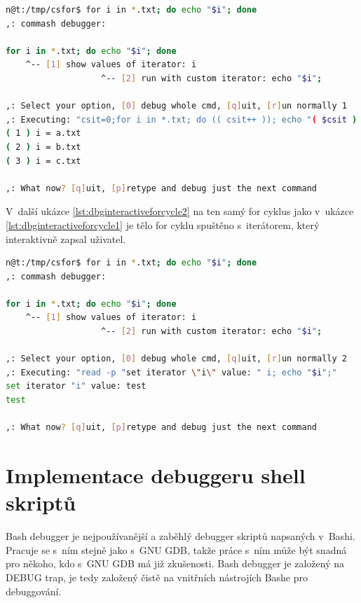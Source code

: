 \documentclass[thesis=M,czech]{FITthesis}[2012/06/26]
\begin{document}
\noindent
\begin{minipage}{\linewidth}
\begin{lstlisting}[language=bash, caption={Debugger interaktivního shellu -- výpis hodnot iterátoru for cyklu }, label={lst:dbginteractiveforcycle1}]
n@t:/tmp/csfor$ for i in *.txt; do echo "$i"; done
,: commash debugger:

for i in *.txt; do echo "$i"; done
    ^-- [1] show values of iterator: i
                   ^-- [2] run with custom iterator: echo "$i";

,: Select your option, [0] debug whole cmd, [q]uit, [r]un normally 1
,: Executing: "csit=0;for i in *.txt; do (( csit++ )); echo "( $csit ) i = $i"; done"
( 1 ) i = a.txt
( 2 ) i = b.txt
( 3 ) i = c.txt

,: What now? [q]uit, [p]retype and debug just the next command
\end{lstlisting}
\end{minipage}

V~další ukázce \ref{lst:dbginteractiveforcycle2} na ten samý for cyklus jako v~ukázce \ref{lst:dbginteractiveforcycle1} je tělo for cyklu spuštěno s~iterátorem, který interaktivně zapsal uživatel.

\noindent
\begin{minipage}{\linewidth}
\begin{lstlisting}[language=bash, caption={Debugger interaktivního shellu -- změna iterátoru for cyklu}, label={lst:dbginteractiveforcycle2}]
n@t:/tmp/csfor$ for i in *.txt; do echo "$i"; done
,: commash debugger:

for i in *.txt; do echo "$i"; done
    ^-- [1] show values of iterator: i
                   ^-- [2] run with custom iterator: echo "$i";

,: Select your option, [0] debug whole cmd, [q]uit, [r]un normally 2
,: Executing: "read -p "set iterator \"i\" value: " i; echo "$i";"
set iterator "i" value: test
test

,: What now? [q]uit, [p]retype and debug just the next command
\end{lstlisting}
\end{minipage}





\section{Implementace debuggeru shell skriptů}

Bash debugger je nejpoužívanější a zaběhlý debugger skriptů napsaných v~Bashi. Pracuje se s~ním stejně jako s~GNU GDB, takže práce s~ním může být snadná pro někoho, kdo s~GNU GDB má již zkušenosti. Bash debugger je založený na DEBUG trap, je tedy založený čistě na vnitřních nástrojích Bashe pro debuggování.
\end{document}
